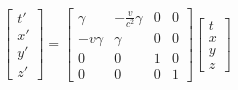 \documentclass[12pt,letterpaper]{report}
\begin{document}
\begin{equation}
    \begin{bmatrix}
        {t}'\\
        x' \\
        y'\\
        z'
    \end{bmatrix}= 
    \begin{bmatrix}
        \gamma & -\frac{v}{c^2}\gamma & 0 & 0 \\
        -v\gamma & \gamma & 0 & 0\\
        0 & 0 & 1 & 0 \\
        0 &  0 & 0 &1
    \end{bmatrix} \begin{bmatrix}
        t \\
        x\\
        y\\
        z
    \end{bmatrix}
    \label{ctx3}
\end{equation}
\end{document}
